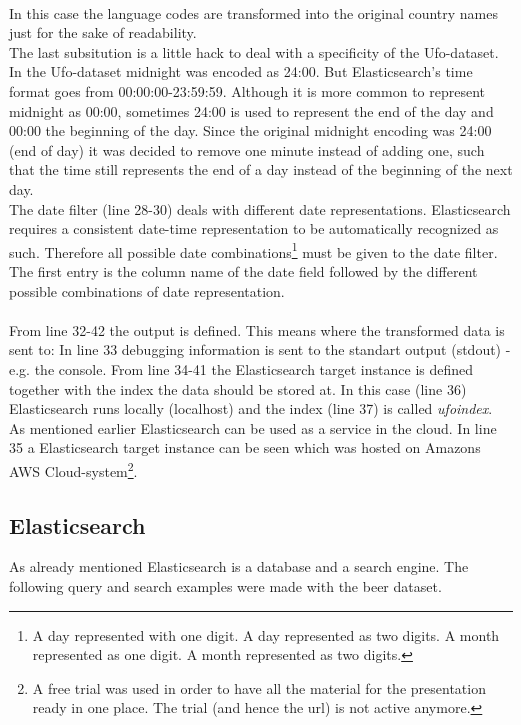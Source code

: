 \documentclass[bibliography=totoc]{article}
\begin{document}
\\
In this case the language codes are transformed into the original country names
just for the sake of readability.
\\
The last subsitution is a little hack to deal with a specificity of the Ufo-dataset.
In the Ufo-dataset midnight was encoded as 24:00. But Elasticsearch's time format goes from
00:00:00-23:59:59. Although it is more common to represent midnight as 00:00, sometimes
24:00 is used to represent the end of the day and 00:00 the beginning of the day.
Since the original midnight encoding was 24:00 (end of day) it was decided to 
remove one minute instead of adding one, such that the time still represents the end 
of a day instead of the beginning of the next day.
\\
The date filter (line 28-30) deals with different date representations.
Elasticsearch requires a consistent date-time representation to be automatically
recognized as such. Therefore all possible date combinations\footnote{A day represented with one digit. A day represented as two digits. A month represented as one digit. A month represented as two digits.} must be 
given to the date filter.
The first entry is the column name of the date field followed by the 
different possible combinations of date representation.
\\
\\
From line 32-42 the output is defined. This means where the transformed data is 
sent to:
In line 33 debugging information is sent to the standart output (stdout) - e.g. the console.
From line 34-41 the Elasticsearch target instance is defined together with the 
index the data should be stored at. In this case (line 36) Elasticsearch
runs locally (localhost) and the index (line 37) is called \textit{ufoindex}.
\\
As mentioned earlier Elasticsearch can be used as a service in the cloud. In line 
35 a Elasticsearch target instance can be seen which was hosted on Amazons AWS Cloud-system\footnote{A free trial was used in order to have all the material for the presentation ready in one place. The trial (and hence the url) is not active anymore.}.

\subsection{Elasticsearch}
As already mentioned Elasticsearch is a database and a search engine.
The following query and search examples were made with the beer dataset.
\end{document}
